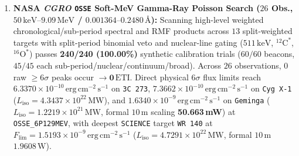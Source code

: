 \documentclass[twocolumn,10pt]{article}
\begin{document}
\begin{enumerate}
  \item \textbf{NASA \textit{CGRO} \texttt{OSSE} Soft-MeV Gamma-Ray Poisson Search ($26$ Obs., $50\,\mathrm{keV}\text{--}9.09\,\mathrm{MeV}$ / $0.001364\text{--}0.2480\,\text{\AA}$):} Scanning high-level weighted chronological/sub-period spectral and RMF products across $13$ split-weighted targets \cite{Johnson1993} with split-period binomial veto and nuclear-line gating ($511\,\mathrm{keV}$, $^{12}\mathrm{C}^\ast$, $^{16}\mathrm{O}^\ast$) passes \textbf{240/240 (100.00\%)} synthetic calibration trials ($60/60$ beacons, $45/45$ each sub-period/nuclear/continuum/broad). Across $26$ observations, $0$ raw $\ge 6\sigma$ peaks occur $\rightarrow \mathbf{0\,\mathrm{ETI}}$. Direct physical $6\sigma$ flux limits reach \textbf{$6.3370\times 10^{-10}\,\mathrm{erg\,cm^{-2}\,s^{-1}}$} on \texttt{3C\,273}, \textbf{$7.3662\times 10^{-10}\,\mathrm{erg\,cm^{-2}\,s^{-1}}$} on \texttt{Cyg\,X-1} ($L_{\mathrm{iso}} = 4.3437\times 10^{22}\,\mathrm{MW}$), and \textbf{$1.6340\times 10^{-9}\,\mathrm{erg\,cm^{-2}\,s^{-1}}$} on \texttt{Geminga} ($L_{\mathrm{iso}} = 1.2219\times 10^{21}\,\mathrm{MW}$, formal $10\,\text{m}$ scaling \textbf{50.663\,mW}) at \texttt{OSSE\_6P129MEV}, with deepest \texttt{SCIENCE} target \texttt{WR\,140} at $F_{\mathrm{lim}} = 1.5193\times 10^{-9}\,\mathrm{erg\,cm^{-2}\,s^{-1}}$ ($L_{\mathrm{iso}} = 4.7291\times 10^{22}\,\mathrm{MW}$, formal $10\,\text{m}$ $1.9608\,\text{W}$).

\end{enumerate}
\end{document}
